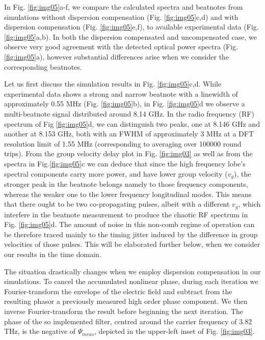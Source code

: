 \documentclass[10pt,letterpaper]{article}
\begin{document}
{In Fig. \ref{fig:img05}a-f, we compare the calculated spectra and beatnotes from simulations without dispersion compensation (Fig. \ref{fig:img05}c,d) and with dispersion compensation (Fig. \ref{fig:img05}e,f), to available experimental data (Fig. \ref{fig:img05}a,b). In both the dispersion compensated and uncompensated case, we observe very good agreement with the detected optical power spectra (Fig. \ref{fig:img05}a), however substantial differences arise when we consider the corresponding beatnotes. 


Let us first discuss the simulation results in Fig. \ref{fig:img05}c,d. While experimental data shows a strong and narrow beatnote with a linewidth of approximately 0.55 MHz (Fig. \ref{fig:img05}b), in  Fig. \ref{fig:img05}d we observe a multi-beatnote signal distributed around 8.14 GHz. In the radio frequency (RF) spectrum of Fig \ref{fig:img05}d, we can distinguish two peaks, one at 8.146 GHz and another at 8.153 GHz, both with an FWHM of approximately 3 MHz at a DFT resolution limit of 1.55 MHz (corresponding to averaging over 100000 round trips). From the group velocity delay plot in Fig. \ref{fig:img03} as well as from the spectra in Fig.\ref{fig:img05}c we can deduce that since the high frequency lobe's spectral components carry more power, and have lower group velocity ($v_g$), the stronger peak in the beatnote belongs namely to those frequency components, whereas the weaker one to the lower frequency longitudinal modes. This means that there ought to be two co-propagating pulses, albeit with a different $v_g$, which interfere in the beatnote measurement to produce the chaotic RF spectrum in Fig. \ref{fig:img05}d. The amount of noise in this non-comb regime of operation can be therefore traced mainly to the timing jitter induced by the difference in group velocities of those pulses. This will be elaborated further below, when we consider our results in the time domain. 

The situation drastically changes when we employ dispersion compensation in our simulations. To cancel the accumulated nonlinear phase, during each iteration we Fourier-transform the envelope of the electric field and subtract from the resulting phasor a previously measured high order phase component. We then inverse Fourier-transform the result before beginning the next iteration. The phase of the so implemented filter, centred around the carrier frequency of $3.82$ THz, is the negative of $\Psi_{meas}$, depicted in the upper-left inset of Fig. \ref{fig:img03}. 

}
\end{document}
